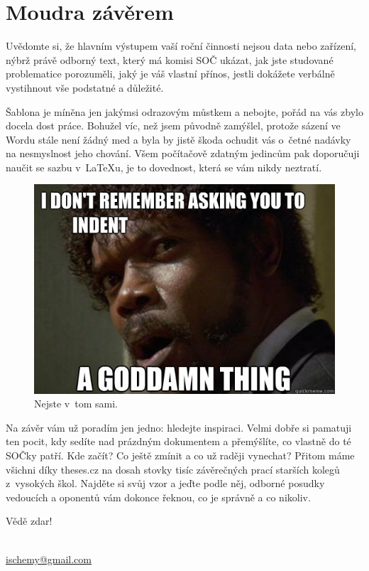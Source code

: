 \section{Moudra závěrem}
Uvědomte si, že hlavním výstupem vaší roční činnosti nejsou data nebo zařízení, nýbrž právě odborný text, který má komisi SOČ ukázat, jak jste studované problematice porozuměli, jaký je váš vlastní přínos, jestli dokážete verbálně vystihnout vše podstatné a důležité.

Šablona je míněna jen jakýmsi odrazovým můstkem a nebojte, pořád na vás zbylo docela dost práce.
Bohužel víc, než jsem původně zamýšlel, protože sázení ve Wordu stále není žádný med a byla by jistě škoda ochudit vás o~četné nadávky na nesmyslnost jeho chování.
Všem počítačově zdatným jedincům pak doporučuji naučit se sazbu v~LaTeXu, je to dovednost, která se vám nikdy neztratí.

\begin{figure}[h]
  	\centering
 	\includegraphics[width=\textwidth]{img/pulp.jpg}
 	\caption{Nejste v~tom sami.}
\end{figure}

Na závěr vám už poradím jen jedno: hledejte inspiraci.
Velmi dobře si pamatuji ten pocit, kdy sedíte nad prázdným dokumentem a přemýšlíte, co vlastně do té SOČky patří.
Kde začít? Co ještě zmínit a co už raději vynechat? Přitom máme všichni díky theses.cz na dosah stovky tisíc závěrečných prací starších kolegů z~vysokých škol.
Najděte si svůj vzor a jeďte podle něj, odborné posudky vedoucích a oponentů vám dokonce řeknou, co je správně a co nikoliv.

\vspace{\baselineskip}
\noindent Vědě zdar!

\vspace{\baselineskip}
\noindent {} \\
\url{ischemy@gmail.com}
